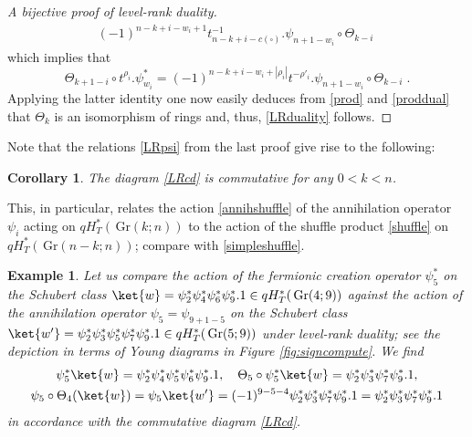 \documentclass[12pt]{amsart}
\newcommand{\Gr}{\,\mathrm{Gr}}
\newtheorem{cor}[prop]{Corollary}
\newtheorem{example}[prop]{Example}
\numberwithin{equation}{section}
\numberwithin{figure}{section}
\begin{document}
\begin{proof}[A bijective proof of level-rank duality]
\begin{multline*}
         (-1)^{n-k+i-w_i+1}t^{-1}_{n - k + i - c(\square)}.\psi_{n + 1 - w_i}\circ\Theta_{k-i} \;
    \end{multline*}
    which implies that
    \begin{equation*}
        \Theta_{k + 1 - i} \circ t^{\rho_i}.\psi^*_{w_i} = (-1)^{n - k + i - w_i + |\rho_i|} t^{-\rho'_i}.\psi_{n + 1 - w_i} \circ \Theta_{k - i}\;.
    \end{equation*}
    Applying the latter identity one now easily deduces from \eqref{prod} and \eqref{proddual} that $\Theta_k$ is an isomorphism of rings and, thus, \eqref{LRduality} follows.
    \end{proof}

Note that the relations \eqref{LRpsi} from the last proof give rise to the following:
\begin{cor}
     The diagram \eqref{LRcd} is commutative for any $0<k<n$.
\end{cor}
This, in particular, relates the action \eqref{annihshuffle} of the annihilation operator $\psi_i$ acting on $qH^*_T(\Gr(k;n))$ to the action of the shuffle product \eqref{shuffle} on $qH^*_T(\Gr(n-k;n))$; compare with \eqref{simpleshuffle}. 

\begin{example}\rm
        Let us compare the action of the fermionic creation operator $\psi^*_5$ on the Schubert class $\ket{w} = \psi^*_2\psi^*_4\psi^*_6\psi^*_9.1 \in qH^*_T(\Gr(4;9))$ against the action of the annihilation operator $\psi_5 = \psi_{9+1 - 5}$ on the Schubert class $\ket{w'} = \psi^*_2\psi^*_3\psi^*_5\psi^*_7\psi^*_9.1 \in qH^*_T(\Gr(5;9))$ under level-rank duality; see the depiction in terms of Young diagrams in Figure \ref{fig:signcompute}. We find
        \begin{gather*}
            \psi^*_5\ket{w} = \psi^*_2\psi^*_4 \psi^*_5\psi^*_6\psi^*_9.1, \quad \Theta_5 \circ \psi^*_5\ket{w} = \psi^*_2\psi^*_3\psi^*_7\psi^*_9.1, \\
            \psi_5 \circ \Theta_4(\ket{w}) = \psi_5 \ket{w'} = (-1)^{9-5-4} \psi^*_2 \psi^*_3 \psi^*_7 \psi^*_9.1 = \psi^*_2 \psi^*_3 \psi^*_7 \psi^*_9.1
        \end{gather*}
        in accordance with the commutative diagram \eqref{LRcd}.
    \end{example}
    
\end{document}
